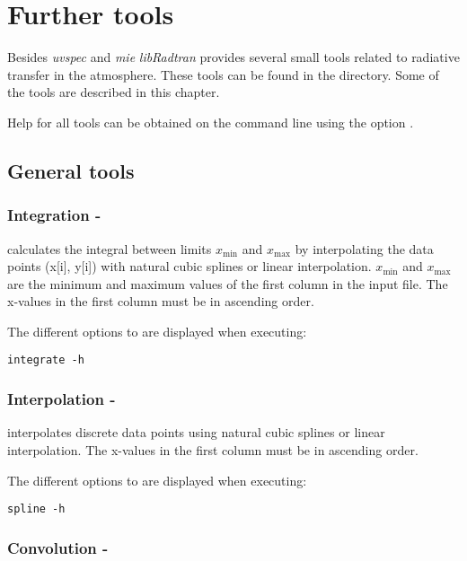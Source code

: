 \chapter{Further tools}
\label{sec:tools}

Besides {\sl uvspec} and {\sl mie} {\sl libRadtran} provides several
small tools related to radiative transfer in the atmosphere. These
tools can be found in the  directory. 
Some of the tools are described in this chapter.
 
Help for all tools can be obtained on the command line using the
option . 

\section{General tools}

\subsection{Integration - }

 calculates the integral between limits
$x_\mathrm{min}$ and $x_\mathrm{max}$ 
by interpolating the data points (x[i], y[i]) with natural cubic
splines or linear interpolation. $x_\mathrm{min}$ and $x_\mathrm{max}$ are the minimum
and maximum values of the first column in the input file. The 
x-values in the first column must be in ascending order.

The different options to  are displayed when executing:

\begin{verbatim}
integrate -h
\end{verbatim}

\subsection{Interpolation - }

 interpolates discrete data points using natural cubic
splines or linear interpolation. The x-values in the first column must 
be in ascending order. 

The different options to  are displayed when executing:

\begin{verbatim}
spline -h
\end{verbatim}

\subsection{Convolution - }
                  
